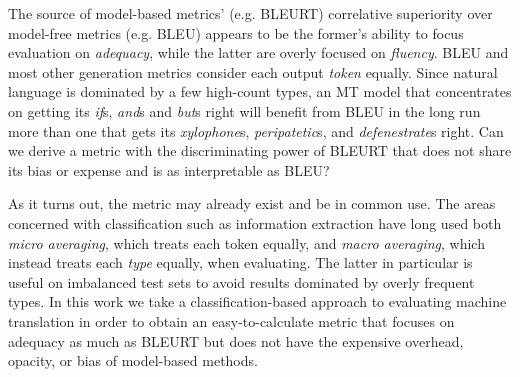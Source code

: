 The source of model-based metrics' (e.g. BLEURT) correlative superiority over model-free metrics (e.g. BLEU) appears to be the former's ability to focus evaluation on \textit{adequacy}, while the latter are overly focused on \textit{fluency}. BLEU and most other generation metrics consider each output \textit{token} equally. Since natural language is dominated by a few high-count types, an MT model that concentrates on getting its \textit{if}s, \textit{and}s and \textit{but}s right will benefit from BLEU in the long run more than one that gets its \textit{xylophone}s, \textit{peripatetic}s, and \textit{defenestrate}s right. Can we derive a metric with the discriminating power of BLEURT that does not share its bias or expense and is as interpretable as BLEU? 

As it turns out, the metric may already exist and be in common use. The areas concerned with classification such as information extraction have long used both \textit{micro averaging}, which treats each token equally, and \textit{macro averaging}, which instead treats each \textit{type} equally, when evaluating. The latter in particular is useful on imbalanced test sets to avoid results dominated by overly frequent types. In this work we take a classification-based approach to evaluating machine translation in order to obtain an easy-to-calculate metric that focuses on adequacy as much as BLEURT but does not have the expensive overhead, opacity, or bias of model-based methods. 


